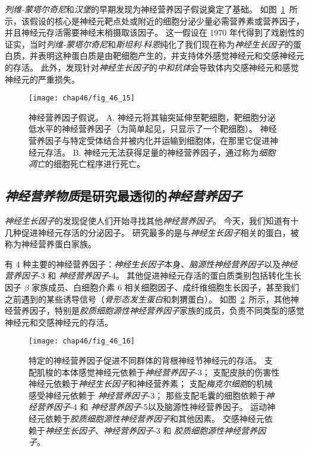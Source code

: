 \textit{列维-蒙塔尔奇尼}和\textit{汉堡}的早期发现为神经营养因子假说奠定了基础。
如图~\ref{fig:46_15}~所示，该假设的核心是神经元靶点处或附近的细胞分泌少量必需营养素或营养因子，并且神经元存活需要神经末梢摄取该因子。
这一假设在 1970 年代得到了戏剧性的证实，当时\textit{列维-蒙塔尔奇尼}和\textit{斯坦利$\cdot$科恩}纯化了我们现在称为\textit{神经生长因子}的蛋白质，并表明这种蛋白质是由靶细胞产生的，并支持体外感觉神经元和交感神经元的存活。
此外，发现针对\textit{神经生长因子}的\textit{中和抗体}会导致体内交感神经元和感觉神经元的严重损失。


\begin{figure}[htbp]
	\centering
	\texttt{[image: chap46/fig\_46\_15]}
	\caption{神经营养因子假说。
		A. 神经元将其轴突延伸至靶细胞，靶细胞分泌低水平的神经营养因子（为简单起见，只显示了一个靶细胞）。
		神经营养因子与特定受体结合并被内化并运输到细胞体，在那里它促进神经元存活。
		B. 神经元无法获得足量的神经营养因子，通过称为\textit{细胞凋亡}的细胞死亡程序进行死亡。}
	\label{fig:46_15}
\end{figure}



\subsection{\textit{神经营养物质}是研究最透彻的\textit{神经营养因子}}

\textit{神经生长因子}的发现促使人们开始寻找其他\textit{神经营养因子}。
今天，我们知道有十几种促进神经元存活的分泌因子。
研究最多的是与\textit{神经生长因子}相关的蛋白，被称为神经营养蛋白家族。


有 4 种主要的神经营养因子：\textit{神经生长因子}本身、\textit{脑源性神经营养因子}以及\textit{神经营养因子}-3 和 \textit{神经营养因子}-4。
其他促进神经元存活的蛋白质类别包括转化生长因子 $ \beta $ 家族成员、白细胞介素 6 相关细胞因子、成纤维细胞生长因子，甚至我们之前遇到的某些诱导信号（\textit{骨形态发生蛋白}和刺猬蛋白）。
如图~\ref{fig:46_16}~所示，其他神经营养因子，特别是\textit{胶质细胞源性神经营养因子}家族的成员，负责不同类型的感觉神经元和交感神经元的存活。


\begin{figure}[htbp]
	\centering
	\texttt{[image: chap46/fig\_46\_16]}
	\caption{特定的神经营养因子促进不同群体的背根神经节神经元的存活。
		支配肌梭的本体感觉神经元依赖于\textit{神经营养因子}-3；
		支配皮肤的伤害性神经元依赖于\textit{神经生长因子}和神经营养素；
		支配\textit{梅克尔细胞}的机械感受神经元依赖于 \textit{神经营养因子}-3；
		那些支配毛囊的细胞依赖于\textit{神经营养因子}-4 和 \textit{神经营养因子}-5以及脑源性神经营养因子。
		运动神经元依赖于\textit{胶质细胞源性神经营养因子}和其他因素。
		交感神经元依赖于\textit{神经生长因子}、\textit{神经营养因子}-3 和 \textit{胶质细胞源性神经营养因子}\cite{reichardt1997neurotrophic}。}
	\label{fig:46_16}
\end{figure}


